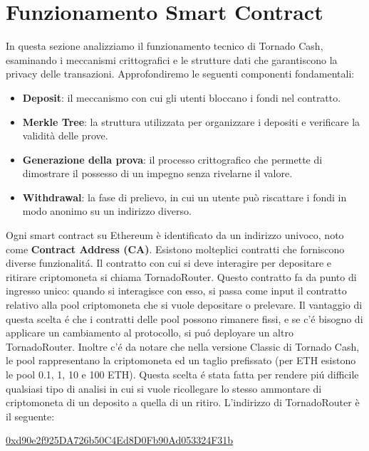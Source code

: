 \chapter{Funzionamento Smart Contract}


In questa sezione analizziamo il funzionamento tecnico di Tornado Cash, esaminando i meccanismi crittografici e le strutture dati che garantiscono la privacy delle transazioni. Approfondiremo le seguenti componenti fondamentali:

\begin{itemize}
    \item \textbf{Deposit}: il meccanismo con cui gli utenti bloccano i fondi nel contratto.
    \item \textbf{Merkle Tree}: la struttura utilizzata per organizzare i depositi e verificare la validità delle prove.
    \item \textbf{Generazione della prova}: il processo crittografico che permette di dimostrare il possesso di un impegno senza rivelarne il valore.
    \item \textbf{Withdrawal}: la fase di prelievo, in cui un utente può riscattare i fondi in modo anonimo su un indirizzo diverso.
\end{itemize}

Ogni smart contract su Ethereum è identificato da un indirizzo univoco, noto come \textbf{Contract Address (CA)}. Esistono molteplici contratti che forniscono diverse funzionalitá. Il contratto con cui si deve interagire per depositare e ritirare criptomoneta si chiama TornadoRouter. Questo contratto fa da punto di ingresso unico: quando si interagisce con esso, si passa come input il contratto relativo alla pool criptomoneta che si vuole depositare o prelevare.
Il vantaggio di questa scelta é che i contratti delle pool possono rimanere fissi, e se c'é bisogno di applicare un cambiamento al protocollo, si puó deployare un altro TornadoRouter.
Inoltre c'é da notare che nella versione Classic di Tornado Cash, le pool rappresentano la criptomoneta ed un taglio prefissato (per ETH esistono le pool 0.1, 1, 10 e 100 ETH). Questa scelta é stata fatta per rendere piú difficile qualsiasi tipo di analisi in cui si vuole ricollegare lo stesso ammontare di criptomoneta di un deposito a quella di un ritiro.
L'indirizzo di TornadoRouter è il seguente:

\vspace{0.5em}
\noindent 
\href{https://etherscan.io/address/0xd90e2f925DA726b50C4Ed8D0Fb90Ad053324F31b}{0xd90e2f925DA726b50C4Ed8D0Fb90Ad053324F31b}

